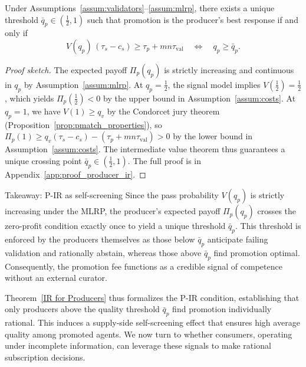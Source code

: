 \begin{theorem}[Producer IR]
\label{IR for Producers}
Under Assumptions~\ref{assum:validators}--\ref{assum:mlrp}, there exists a unique threshold $\bar{q}_p \in (\tfrac{1}{2}, 1)$ such that promotion is the producer's best response if and only if
\begin{equation}
\label{eq:producer_threshold}
V(q_p)\,(\tau_s - c_s) \geq \tau_p + mn\tau_{\text{val}} \quad \Longleftrightarrow \quad q_p \geq \bar{q}_p.
\end{equation}
\end{theorem}

\begin{proof}[Proof sketch]
The expected payoff $\Pi_p(q_p)$ is strictly increasing and continuous in $q_p$ by Assumption~\ref{assum:mlrp}. At $q_p = \tfrac{1}{2}$, the signal model implies $V(\tfrac{1}{2}) = \tfrac{1}{2}$, which yields $\Pi_p(\tfrac{1}{2}) < 0$ by the upper bound in Assumption~\ref{assum:costs}. At $q_p = 1$, we have $V(1) \geq q_v$ by the Condorcet jury theorem (Proposition~\ref{prop:pmatch_properties}), so $\Pi_p(1) \geq q_v(\tau_s - c_s) - (\tau_p + mn\tau_{\text{val}}) > 0$ by the lower bound in Assumption~\ref{assum:costs}. The intermediate value theorem thus guarantees a unique crossing point $\bar{q}_p \in (\tfrac{1}{2}, 1)$. The full proof is in Appendix~\ref{app:proof_producer_ir}.
\end{proof}

\begin{interpretbox}{Takeaway: P-IR as self-screening}
Since the pass probability $V(q_p)$ is strictly increasing under the MLRP, the producer's expected payoff $\Pi_p(q_p)$ crosses the zero-profit condition exactly once to yield a unique threshold $\bar{q}_p$. This threshold is enforced by the producers themselves as those below $\bar{q}_p$ anticipate failing validation and rationally abstain, whereas those above $\bar{q}_p$ find promotion optimal. Consequently, the promotion fee functions as a credible signal of competence without an external curator.
\end{interpretbox}

\noindent Theorem~\ref{IR for Producers} thus formalizes the P-IR condition, establishing that only producers above the quality threshold $\bar{q}_p$ find promotion individually rational. This induces a supply-side self-screening effect that ensures high average quality among promoted agents. We now turn to whether consumers, operating under incomplete information, can leverage these signals to make rational subscription decisions.

